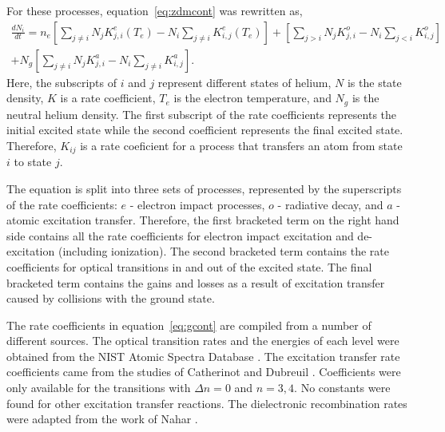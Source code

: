 For these processes, equation~\ref{eq:zdmcont} was rewritten as,
\begin{multline}
  \frac{dN_i}{dt} =   n_e \left[       \sum_{j\neq i} N_j K^e_{j,i}(T_e) 
                                 - N_i \sum_{j\neq i}     K^e_{i,j}(T_e) \right]
                        + \left[       \sum_{j > i}   N_j K^o_{j,i} 
                                 - N_i \sum_{j < i}       K^o_{i,j}      \right] \\
                    + N_g \left[       \sum_{j\neq i} N_j K^a_{j,i} 
                                 - N_i \sum_{j\neq i}     K^a_{i,j}      \right].
  \label{eq:gcont}
\end{multline}
Here, the subscripts of $i$ and $j$ represent different states of helium, $N$ is
the state density, $K$ is a rate coefficient, $T_e$ is the electron temperature,
and $N_g$ is the neutral helium density. The first subscript of the rate
coefficients represents the initial excited state while the second coefficient
represents the final excited state. Therefore, $K_{ij}$ is a rate coeficient for
a process that transfers an atom from state $i$ to state $j$.

The equation is split into three sets of processes, represented by the
superscripts of the rate coefficients: $e$ - electron impact processes, $o$ -
radiative decay, and $a$ - atomic excitation transfer. Therefore, the first
bracketed term on the right hand side contains all the rate coefficients for
electron impact excitation and de-excitation (including ionization). The second
bracketed term contains the rate coefficients for optical transitions in and out
of the excited state. The final bracketed term contains the gains and losses as
a result of excitation transfer caused by collisions with the ground state.

The rate coefficients in equation~\ref{eq:gcont} are compiled from a number of
different sources. The optical transition rates and the energies of each level
were obtained from the NIST Atomic Spectra Database \cite{Kramida2012}. The
excitation transfer rate coefficients came from the studies of Catherinot and
Dubreuil \cite{Catherinot1981, Dubreuil1980}. Coefficients were only available
for the transitions with $\Delta n=0$ and $n=3,4$. No constants were found for
other excitation transfer reactions. The dielectronic recombination rates were
adapted from the work of Nahar \cite{Nahar2010}.

